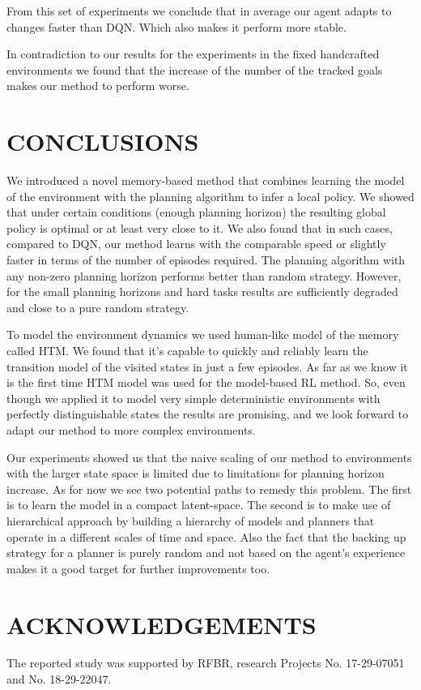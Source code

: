 \documentclass[a4paper,twoside]{article}
\begin{document}
From this set of experiments we conclude that in average our agent adapts to changes faster than DQN. Which also makes it perform more stable.

In contradiction to our results for the experiments in the fixed handcrafted environments we found that the increase of the number of the tracked goals makes our method to perform worse.

\section{\uppercase{Conclusions}}

We introduced a novel memory-based method that combines learning the model of the environment with the planning algorithm to infer a local policy. We showed that under certain conditions (enough planning horizon) the resulting global policy is optimal or at least very close to it. We also found that in such cases, compared to DQN, our method learns with the comparable speed or slightly faster in terms of the number of episodes required. The planning algorithm with any non-zero planning horizon performs better than random strategy. However, for the small planning horizons and hard tasks results are sufficiently degraded and close to a pure random strategy.

To model the environment dynamics we used human-like model of the memory called HTM. We found that it's capable to quickly and reliably learn the transition model of the visited states in just a few episodes. As far as we know it is the first time HTM model was used for the model-based RL method. So, even though we applied it to model very simple deterministic environments with perfectly distinguishable states the results are promising, and we look forward to adapt our method to more complex environments.

Our experiments showed us that the naive scaling of our method to environments with the larger state space is limited due to limitations for planning horizon increase. As for now we see two potential paths to remedy this problem. The first is to learn the model in a compact latent-space. The second is to make use of hierarchical approach by building a hierarchy of models and planners that operate in a different scales of time and space. Also the fact that the backing up strategy for a planner is purely random and not based on the agent's experience makes it a good target for further improvements too.

\section*{\uppercase{Acknowledgements}}
The reported study was supported by RFBR, research Projects No. 17-29-07051 and No. 18-29-22047.
\end{document}
